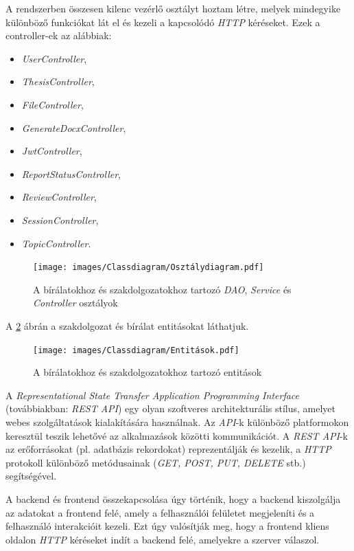A rendszerben összesen kilenc vezérlő osztályt hoztam létre, melyek mindegyike különböző funkciókat lát el és kezeli a kapcsolódó \textit{HTTP} kéréseket. Ezek a controller-ek az alábbiak:
\begin{itemize}
\setlength\itemsep{0pt}
\item{\textit{UserController}},
\item{\textit{ThesisController}},
\item{\textit{FileController}},
\item{\textit{GenerateDocxController}},
\item{\textit{JwtController}},
\item{\textit{ReportStatusController}},
\item{\textit{ReviewController}},
\item{\textit{SessionController}},
\item{\textit{TopicController}}.

\end{itemize}
\begin{figure}[h!]
	\texttt{[image: images/Classdiagram/Osztálydiagram.pdf]}
	\caption{A bírálatokhoz és szakdolgozatokhoz tartozó \textit{DAO}, \textit{Service} és \textit{Controller} osztályok}
	\label{fig:Osztálydiagram}
\end{figure}
\newpage
A \ref{fig:Entitások} ábrán a szakdolgozat és bírálat entitásokat láthatjuk. 
\begin{figure}[h!]
	\texttt{[image: images/Classdiagram/Entitások.pdf]}
	\caption{A bírálatokhoz és szakdolgozatokhoz tartozó entitások}
	\label{fig:Entitások}
\end{figure}

\newpage


A \textit{Representational State Transfer Application Programming Interface} (továbbiakban: \textit{REST API}) \cite{REST API} egy olyan szoftveres architekturális stílus, amelyet webes szolgáltatások kialakítására használnak. Az \textit{API}-k különböző platformokon keresztül teszik lehetővé az alkalmazások közötti kommunikációt. A \textit{REST API}-k \cite{REST API} az erőforrásokat (pl. adatbázis rekordokat) reprezentálják és kezelik, a \textit{HTTP} \cite{http} protokoll különböző metódusainak (\textit{GET, POST, PUT, DELETE} stb.) segítségével.

A backend és frontend összekapcsolása úgy történik, hogy a backend kiszolgálja az adatokat a frontend felé, amely a felhasználói felületet megjeleníti és a felhasználó interakcióit kezeli. Ezt úgy valósítják meg, hogy a frontend kliens oldalon \textit{HTTP} kéréseket indít a backend felé, amelyekre a szerver válaszol.\\

